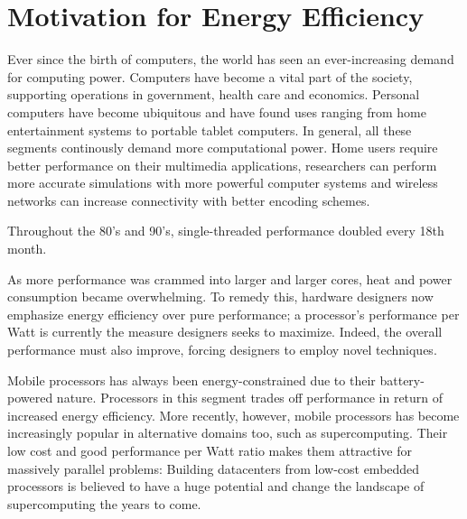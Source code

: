 \section{Motivation for Energy Efficiency}

Ever since the birth of computers, the world has seen an ever-increasing demand
for computing power. Computers have become a vital part of the society,
supporting operations in government, health care and economics. Personal
computers have become ubiquitous and have found uses ranging from home
entertainment systems to portable tablet computers. In general, all these
segments continously demand more computational power. Home users require better
performance on their multimedia applications, researchers can perform more
accurate simulations with more powerful computer systems and wireless networks
can increase connectivity with better encoding schemes.




Throughout the 80's and 90's, single-threaded performance doubled every 18th
month.

As more performance was crammed into larger and larger cores, heat and
power consumption became overwhelming. To remedy this, hardware designers now
emphasize energy efficiency over pure performance; a processor's performance per
Watt is currently the measure designers seeks to maximize. Indeed, the overall
performance must also improve, forcing designers to employ novel techniques.


Mobile processors has always been energy-constrained due to their
battery-powered nature. Processors in this segment trades off performance in
return of increased energy efficiency. More recently, however, mobile processors
has become increasingly popular in alternative domains too, such as
supercomputing. Their low cost and good performance per Watt ratio makes them
attractive for massively parallel problems: Building datacenters from low-cost
embedded processors is believed to have a huge potential and change the
landscape of supercomputing the years to come.

